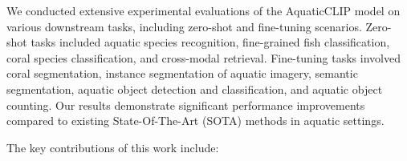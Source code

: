 We conducted extensive experimental evaluations of the AquaticCLIP model on various downstream tasks, including zero-shot and fine-tuning scenarios. 
Zero-shot tasks included aquatic species recognition, fine-grained fish classification, coral species classification, and cross-modal retrieval.
Fine-tuning tasks involved coral segmentation, instance segmentation of aquatic imagery, semantic segmentation, aquatic object detection and classification, and aquatic object counting. 
Our results demonstrate significant performance improvements compared to existing State-Of-The-Art (SOTA) methods in aquatic settings.

The key contributions of this work include: 
\begin{comment}
 \begin{enumerate}
\item We propose a large-scale 2M image-text paired dataset specifically designed for pre-training aquatic VLMs (Sec. \ref{sec:dataset}).
\item \textcolor{blue}{To further enrich the textual descriptions, for the aquatic images in our dataset, we also generate pseudo-descriptions using MarineGPT in zero-shot settings at the image and instance levels (Sec. \ref{sec:generation}).
These descriptions are then refined to remove undesired keywords, improving overall data quality (Sec. \ref{sec:cleaning}).}
\item We introduce a learnable prompts-guided image encoder that enhances the encoding of aquatic images. 
By utilizing learnable prompts, irrelevant image regions are suppressed, resulting in more effective visual representations (Sec. \ref{sec:pgve}).
\item We propose a vision-guided text encoder that aligns textual descriptions with corresponding visual context more accurately (Sec. \ref{sec:vgte}). 
This refined textual representation is used for efficient pre-training of the VLM (Sec. \ref{loss}).
\item  Extensive experimental evaluations are conducted on various downstream aquatic computer vision tasks, including instance segmentation, semantic segmentation, zero-shot aquatic species recognition, aquatic object counting, and challenging aquatic object detection. 
Our results show significant performance improvements compared to existing SOTA methods in aquatic environments (Sec. \ref{sec:results}).
\end{enumerate}
\end{comment}

